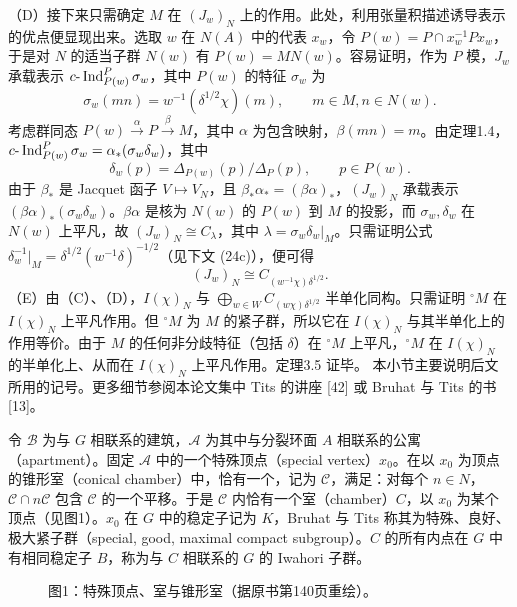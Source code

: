 （D）接下来只需确定 $M$ 在 $(J_w)_N$ 上的作用。此处，利用张量积描述诱导表示的优点便显现出来。选取 $w$ 在 $N(A)$ 中的代表 $x_w$，令 $P(w)=P\cap x_w^{-1}Px_w$，于是对 $N$ 的适当子群 $N(w)$ 有 $P(w)=MN(w)$。容易证明，作为 $P$ 模，$J_w$ 承载表示 $c\text{-}\operatorname{Ind}_{P(w)}^P\sigma_w$，其中 $P(w)$ 的特征 $\sigma_w$ 为
\[
\sigma_w(mn)=w^{-1}(\delta^{1/2}\chi)(m),\qquad m\in M,n\in N(w).\tag{17}
\]
考虑群同态 $P(w)\xrightarrow\alpha P\xrightarrow\beta M$，其中 $\alpha$ 为包含映射，$\beta(mn)=m$。由定理1.4，$c\text{-}\operatorname{Ind}_{P(w)}^P\sigma_w=\alpha_*(\sigma_w\delta_w)$，其中
\[
\delta_w(p)=\Delta_{P(w)}(p)/\Delta_P(p),\qquad p\in P(w).\tag{18}
\]
由于 $\beta_*$ 是 Jacquet 函子 $V\mapsto V_N$，且 $\beta_*\alpha_*=(\beta\alpha)_*$，$(J_w)_N$ 承载表示 $(\beta\alpha)_*(\sigma_w\delta_w)$。$\beta\alpha$ 是核为 $N(w)$ 的 $P(w)$ 到 $M$ 的投影，而 $\sigma_w,\delta_w$ 在 $N(w)$ 上平凡，故 $(J_w)_N\cong C_\lambda$，其中 $\lambda=\sigma_w\delta_w|_M$。只需证明公式 $\delta_w^{-1}|_M=\delta^{1/2}(w^{-1}\delta)^{-1/2}$（见下文 (24c)），便可得
\[
(J_w)_N\cong C_{(w^{-1}\chi)\delta^{1/2}}.\tag{19}
\]
（E）由（C）、（D），$I(\chi)_N$ 与 $\bigoplus_{w\in W}C_{(w\chi)\delta^{1/2}}$ 半单化同构。只需证明 $^\circ M$ 在 $I(\chi)_N$ 上平凡作用。但 $^\circ M$ 为 $M$ 的紧子群，所以它在 $I(\chi)_N$ 与其半单化上的作用等价。由于 $M$ 的任何非分歧特征（包括 $\delta$）在 $^\circ M$ 上平凡，$^\circ M$ 在 $I(\chi)_N$ 的半单化上、从而在 $I(\chi)_N$ 上平凡作用。定理3.5 证毕。
本小节主要说明后文所用的记号。更多细节参阅本论文集中 Tits 的讲座 [42] 或 Bruhat 与 Tits 的书 [13]。

令 $\mathcal B$ 为与 $G$ 相联系的建筑，$\mathcal A$ 为其中与分裂环面 $A$ 相联系的公寓（apartment）。固定 $\mathcal A$ 中的一个特殊顶点（special vertex）$x_0$。在以 $x_0$ 为顶点的锥形室（conical chamber）中，恰有一个，记为 $\mathcal C$，满足：对每个 $n\in N$，$\mathcal C\cap n\mathcal C$ 包含 $\mathcal C$ 的一个平移。于是 $\mathcal C$ 内恰有一个室（chamber）$C$，以 $x_0$ 为某个顶点（见图1）。$x_0$ 在 $G$ 中的稳定子记为 $K$，Bruhat 与 Tits 称其为特殊、良好、极大紧子群（special, good, maximal compact subgroup）。$C$ 的所有内点在 $G$ 中有相同稳定子 $B$，称为与 $C$ 相联系的 $G$ 的 Iwahori 子群。
\begin{figure}[htbp]
\centering
{}
\caption*{图1：特殊顶点、室与锥形室（据原书第140页重绘）。}
\end{figure}

